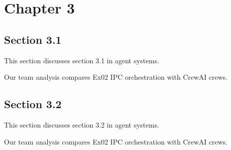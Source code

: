 \section{Chapter 3}

\subsection{Section 3.1}
This section discusses section 3.1 in agent systems. \cite{crewai2024}

Our team analysis compares Ex02 IPC orchestration with CrewAI crews. \cite{crewai2024}

\subsection{Section 3.2}
This section discusses section 3.2 in agent systems. \cite{crewai2024}

Our team analysis compares Ex02 IPC orchestration with CrewAI crews. \cite{crewai2024}
